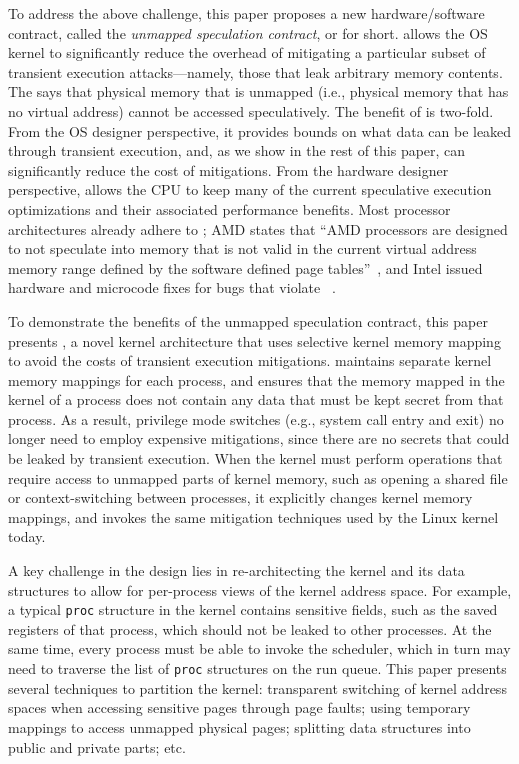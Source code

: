 
To address the above challenge, this paper proposes a new
hardware/software contract, called the \emph{unmapped speculation
contract}, or \contract{} for short.  \contract{} allows the OS kernel
to significantly reduce the overhead of mitigating a particular subset
of transient execution attacks---namely, those that leak arbitrary
memory contents.  The \contract{} says that physical memory that is
unmapped (i.e., physical memory that has no virtual address) cannot
be accessed speculatively.  The
benefit of \contract is two-fold.  From the OS designer perspective,
it provides bounds on what data can be leaked through transient execution,
and, as we show in the rest of this paper, can significantly reduce the
cost of mitigations.  From the hardware designer perspective, \contract
allows the CPU to keep many of the current speculative execution
optimizations and their associated performance benefits.  Most
processor architectures already adhere to \contract; AMD
states that ``AMD processors are designed to not speculate into memory
that is not valid in the current virtual address memory range defined
by the software defined page tables''~\cite[pg. 2]{amd:speculation},
and Intel issued hardware and microcode fixes for bugs that violate
\contract~\cite{intel:meltdown, intel:l1tf}.

To demonstrate the benefits of the unmapped speculation contract,
this paper presents \sys{}, a novel kernel architecture that uses
selective kernel memory mapping to avoid the costs of transient execution
mitigations.  \sys{} maintains separate kernel memory mappings for each
process, and ensures that the memory mapped in the kernel of a process
does not contain any data that must be kept secret from that process.
As a result, privilege mode switches (e.g., system call entry and exit)
no longer need to employ expensive mitigations, since there are no
secrets that could be leaked by transient execution.  When the \sys{}
kernel must perform operations that require access to unmapped parts
of kernel memory, such as opening a shared file or context-switching
between processes, it explicitly changes kernel memory mappings, and
invokes the same mitigation techniques used by the Linux kernel today.

A key challenge in the \sys design lies in re-architecting the kernel
and its data structures to allow for per-process views of the
kernel address space.  For example, a typical \texttt{proc} structure in
the kernel contains sensitive fields, such as the saved registers of that
process, which should not be leaked to other processes.  At the same time,
every process must be able to invoke the scheduler, which in turn may
need to traverse the list of \texttt{proc} structures on the run queue.
This paper presents several techniques to partition the kernel:
transparent switching of kernel address spaces when accessing sensitive
pages through page faults; using temporary mappings to access unmapped
physical pages; splitting data structures into public and private
parts; etc.

